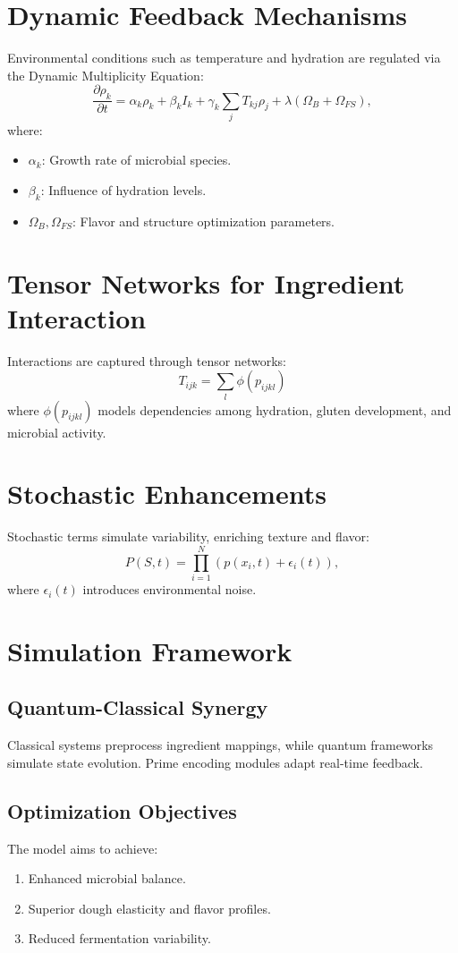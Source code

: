 \documentclass{article}
\theoremstyle{plain}
\begin{document}
\section{Dynamic Feedback Mechanisms}
Environmental conditions such as temperature and hydration are regulated via the Dynamic Multiplicity Equation:\\
\[ \frac{\partial \rho_k}{\partial t} = \alpha_k \rho_k + \beta_k I_k + \gamma_k \sum_{j} T_{kj} \rho_j + \lambda (\Omega_B + \Omega_{FS}), \]
where:
\begin{itemize}
    \item \( \alpha_k \): Growth rate of microbial species.
    \item \( \beta_k \): Influence of hydration levels.
    \item \( \Omega_B, \Omega_{FS} \): Flavor and structure optimization parameters.
\end{itemize}

\section{Tensor Networks for Ingredient Interaction}
Interactions are captured through tensor networks:\\
\[ T_{ijk} = \sum_{l} \phi(p_{ijkl}) \]
where \( \phi(p_{ijkl}) \) models dependencies among hydration, gluten development, and microbial activity.

\section{Stochastic Enhancements}
Stochastic terms simulate variability, enriching texture and flavor:\\
\[ P(S, t) = \prod_{i=1}^{N} \left( p(x_i, t) + \epsilon_i(t) \right), \]
where \( \epsilon_i(t) \) introduces environmental noise.

\section{Simulation Framework}
\subsection{Quantum-Classical Synergy}
Classical systems preprocess ingredient mappings, while quantum frameworks simulate state evolution. Prime encoding modules adapt real-time feedback.

\subsection{Optimization Objectives}
The model aims to achieve:
\begin{enumerate}
    \item Enhanced microbial balance.
    \item Superior dough elasticity and flavor profiles.
    \item Reduced fermentation variability.
\end{enumerate}
\end{document}
